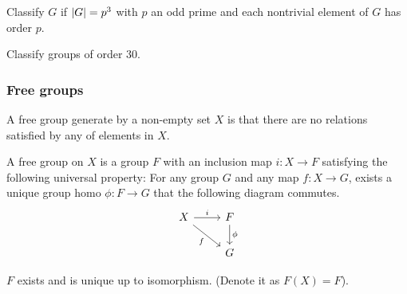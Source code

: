 \begin{exercise}
  Classify $G$ if $\lvert G\rvert = p^3$ with $p$ an odd prime and each nontrivial element of $G$ has order $p$.
\end{exercise}

\begin{exercise}
  Classify groups of order $30$.
\end{exercise}

\subsubsection{Free groups}
A free group generate by a non-empty set $X$ is that
there are no relations satisfied by any of elements in $X$.

\begin{definition}
  A free group on $X$ is a group $F$ with an inclusion map $i: X \to F$ satisfying the
  following universal property: For any group $G$ and any map $f: X \to G$,
  exists a unique group homo $\phi : F \to G$ that the following diagram commutes.
  \[
    \begin{tikzcd}
    X \arrow{r}{i} \arrow[swap]{dr}{f} & F \arrow{d}{\phi} \\
    & G
    \end{tikzcd}
  \]
\end{definition}

\begin{theorem}
  $F$ exists and is unique up to isomorphism. (Denote it as $F(X) = F$).
\end{theorem}

